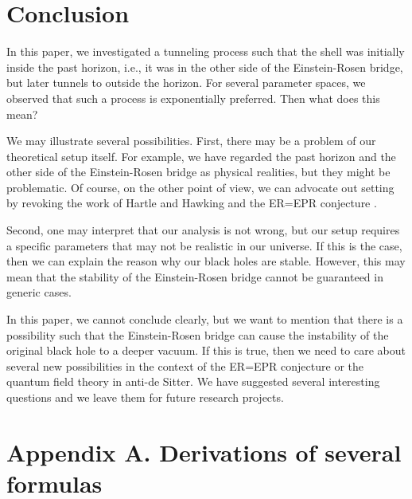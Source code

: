 \documentclass[preprintnumbers,10pt,nofootinbib]{revtex4}
\begin{document}
\section{\label{sec:con}Conclusion}

In this paper, we investigated a tunneling process such that the shell was initially inside the past horizon, i.e., it was in the other side of the Einstein-Rosen bridge, but later tunnels to outside the horizon. For several parameter spaces, we observed that such a process is exponentially preferred. Then what does this mean?

We may illustrate several possibilities. First, there may be a problem of our theoretical setup itself. For example, we have regarded the past horizon and the other side of the Einstein-Rosen bridge as physical realities, but they might be problematic. Of course, on the other point of view, we can advocate out setting by revoking the work of Hartle and Hawking \cite{Hartle:1976tp} and the ER=EPR conjecture \cite{Maldacena:2013xja}.

Second, one may interpret that our analysis is not wrong, but our setup requires a specific parameters that may not be realistic in our universe. If this is the case, then we can explain the reason why our black holes are stable. However, this may mean that the stability of the Einstein-Rosen bridge cannot be guaranteed in generic cases.

In this paper, we cannot conclude clearly, but we want to mention that there is a possibility such that the Einstein-Rosen bridge can cause the instability of the original black hole to a deeper vacuum. If this is true, then we need to care about several new possibilities in the context of the ER=EPR conjecture or the quantum field theory in anti-de Sitter. We have suggested several interesting questions and we leave them for future research projects.


\newpage

\section*{Appendix A. Derivations of several formulas}
\end{document}
